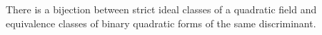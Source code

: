 There is a bijection between strict ideal classes of a quadratic field and equivalence classes of binary quadratic forms of the same discriminant.
